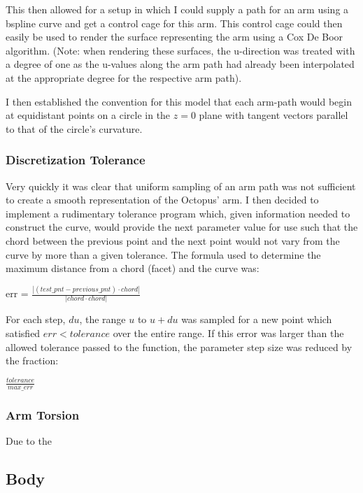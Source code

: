 \documentclass[twocolumn]{article}
\begin{document}
This then allowed for a setup in which I could supply a path for an arm using a bspline curve and get a control cage for this arm. This control cage could then easily be used to render the surface representing the arm using a Cox De Boor algorithm. (Note: when rendering these surfaces, the u-direction was treated with a degree of one as the u-values along the arm path had already been interpolated at the appropriate degree for the respective arm path).

I then established the convention for this model that each arm-path would begin at equidistant points on a circle in the $z=0$ plane with tangent vectors parallel to that of the circle's curvature.

\subsubsection{Discretization Tolerance}

Very quickly it was clear that uniform sampling of an arm path was not sufficient to create a smooth representation of the Octopus' arm. I then decided to implement a rudimentary tolerance program which, given information needed to construct the curve, would provide the next parameter value for use such that the chord between the previous point and the next point would not vary from the curve by more than a given tolerance. The formula used to determine the maximum distance from a chord (facet) and the curve was:

\begin{center}
{err = $\frac{|(test\_pnt-previous\_pnt) \cdot chord|}{|chord \cdot chord|}$}
\end{center}

For each step, $du$, the range $u$ to $u+du$ was sampled for a new point which satisfied $err < tolerance$ over the entire range. If this error was larger than the allowed tolerance passed to the function, the parameter step size was reduced by the fraction:

\begin{center}
$ \frac{tolerance}{max\_err} $
\end{center}

\subsubsection{Arm Torsion}

Due to the 
\subsection{Body}
\end{document}
